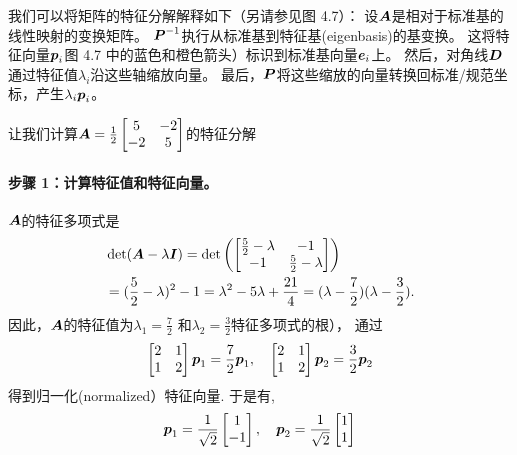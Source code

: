我们可以将矩阵的特征分解解释如下（另请参见图 4.7）：
设$\A$是相对于标准基的线性映射的变换矩阵。
$\P^{-1}$执行从标准基到特征基(eigenbasis)的基变换。
这将特征向量$\p_i$图 4.7 中的蓝色和橙色箭头）标识到标准基向量$\e_i$上。
然后，对角线$\D$通过特征值$\lambda_i$沿这些轴缩放向量。
最后，$\P$将这些缩放的向量转换回标准/规范坐标，产生$\lambda_i\p_i$。

\begin{example}[特征分解]
让我们计算$\A = \frac{1}{2}
\begin{bmatrix}
    5 & -2 \\
    -2 & 5
\end{bmatrix}$的特征分解
\paragraph{步骤 1：计算特征值和特征向量。}
$\A$的特征多项式是
\begin{subequations}
    \begin{align}
        &\det(\A - \lambda\I) =
        \det\left(
            \begin{bmatrix}
                \frac{5}{2} - \lambda & -1 \\
                -1 & \frac{5}{2} - \lambda
            \end{bmatrix}
        \right) \\
        &= (\frac{5}{2} - \lambda)^2 - 1 =
        \lambda^2 - 5\lambda + \frac{21}{4} =
        (\lambda - \frac{7}{2})(\lambda - \frac{3}{2}).
    \end{align}
\end{subequations}
因此，$\A$的特征值为$\lambda_1 = \frac{7}{2}$
和$\lambda_2 = \frac{3}{2}$特征多项式的根），
通过
\begin{equation}
    \begin{bmatrix}
        2 & 1 \\
        1 & 2
    \end{bmatrix}\p_1
    = \frac{7}{2} \p_1,\quad
    \begin{bmatrix}
        2 & 1 \\
        1 & 2
    \end{bmatrix}\p_2
    = \frac{3}{2} \p_2
\end{equation}
得到归一化(normalized）特征向量.
于是有,
\begin{equation}
    \p_1 = \frac{1}{\sqrt{2}}
    \begin{bmatrix}
        1 \\ -1
    \end{bmatrix},\quad
    \p_2 = \frac{1}{\sqrt{2}}
    \begin{bmatrix}
        1 \\ 1
    \end{bmatrix}
\end{equation}

\end{example}
